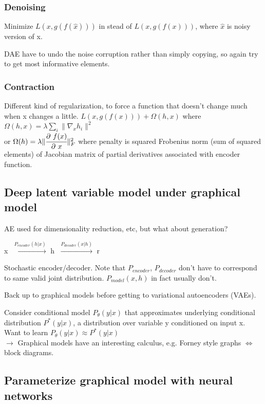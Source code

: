 \documentclass[12pt,a4paper]{article}
\begin{document}
\subsubsection{Denoising}
Minimize $L(x, g(f(\hat{x})))$ in stead of $L(x, g(f(x)))$, where $\hat{x}$ is noisy version of x. 

DAE have to undo the noise corruption rather than simply copying, so again try to get most informative elements. 

\subsubsection{Contraction}
Different kind of regularization, to force a function that doesn't change much when x changes a little. 
$L(x, g(f(x)))+\Omega(h, x)$ where $\Omega(h, x)=\lambda \sum_i\|\nabla_xh_i\|^2$\\ 
or $\Omega(h)=\lambda \|\cfrac{\partial\ f(x)}{\partial\ x}\|^2_F$ where penalty is squared Frobenius norm (sum of squared elements) of Jacobian matrix of partial derivatives associated with encoder function. 

\subsection{Deep latent variable model under graphical model}
AE used for dimensionality reduction, etc, but what about generation?

\textcircled{x} $\overset{P_{encoder}(h|x)}{\longrightarrow}$ \textcircled{h} $\overset{P_{decoder}(x|h)} {\longrightarrow}$ \textcircled{r}

Stochastic encoder/decoder. Note that $P_{encoder}$, $P_{decoder}$ don't have to correspond to same valid joint distribution. $P_{model}(x,h)$ in fact usually don't. 

\vspace{0.5cm}
Back up to graphical models before getting to variational autoencoders (VAEs).

Consider conditional model $P_\theta(y|x)$ that approximates underlying conditional distribution $P^*(y|x)$, a distribution over variable y conditioned on input x. \\
Want to learn $P_\theta(y|x)\approx P^*(y|x)$\\
$\rightarrow$ Graphical models have an interesting calculus, e.g. Forney style graphs $\Leftrightarrow$ block diagrams. 

\subsection{Parameterize graphical model with neural networks}
\end{document}
